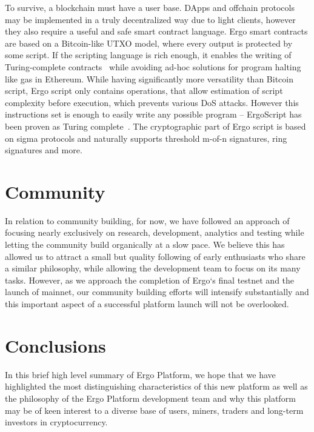 \documentclass[]{article}
\begin{document}
    To survive, a blockchain must have a user base. DApps and offchain protocols may be
    implemented in a truly decentralized way due to light clients, however they also require a useful
    and safe smart contract language. Ergo smart contracts are based on a Bitcoin-like UTXO
    model, where every output is protected by some script. If the scripting language is rich enough,
    it enables the writing of Turing-complete contracts~\cite{chepurnoy2018self} while avoiding ad-hoc solutions for
    program halting like gas in Ethereum. While having significantly more versatility than Bitcoin
    script, Ergo script only contains operations, that allow estimation of script complexity before
    execution, which prevents various DoS attacks. However this instructions set is enough to
    easily write any possible program -- ErgoScript has been proven as Turing complete~\cite{chepurnoy2018self}. The
    cryptographic part of Ergo script is based on sigma protocols and naturally supports threshold
    m-of-n signatures, ring signatures and more.

    \section{Community}

    In relation to community building, for now, we have followed an approach of focusing nearly
    exclusively on research, development, analytics and testing while letting the community build
    organically at a slow pace. We believe this has allowed us to attract a small but quality following
    of early enthusiasts who share a similar philosophy, while allowing the development team to
    focus on its many tasks. However, as we approach the completion of Ergo`s final testnet and the
    launch of mainnet, our community building efforts will intensify substantially and this important
    aspect of a successful platform launch will not be overlooked.

    \section{Conclusions}

    In this brief high level summary of Ergo Platform, we hope that we have highlighted the most
    distinguishing characteristics of this new platform as well as the philosophy of the Ergo Platform
    development team and why this platform may be of keen interest to a diverse base of users,
    miners, traders and long-term investors in cryptocurrency.

    
\end{document}
